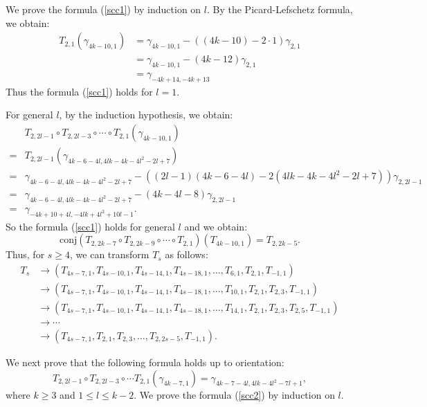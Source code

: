 \documentclass{amsart}
\theoremstyle{plain}
\theoremstyle{definition}
\begin{document}
\par

We prove the formula (\ref{scc1}) by induction on $l$. 
By the Picard-Lefschetz formula, we obtain: 
{\allowdisplaybreaks
\begin{align*}
T_{2,1}(\gamma_{4k-10,1}) &= \gamma_{4k-10,1}-((4k-10)-2\cdot 1)\gamma_{2,1} \\
&= \gamma_{4k-10,1}-(4k-12)\gamma_{2,1} \\
&= \gamma_{-4k+14,-4k+13} 
\end{align*}
}
Thus the formula (\ref{scc1}) holds for $l=1$. 

\par

For general $l$, by the induction hypothesis, we obtain: 
{\allowdisplaybreaks
\begin{align*}
& T_{2,2l-1}\circ T_{2,2l-3}\circ\cdots\circ T_{2,1}(\gamma_{4k-10,1}) \\
= & T_{2,2l-1}(\gamma_{4k-6-4l,4lk-4k-4l^2-2l+7}) \\
= & \gamma_{4k-6-4l,4lk-4k-4l^2-2l+7}-((2l-1)(4k-6-4l)-2(4lk-4k-4l^2-2l+7))\gamma_{2,2l-1} \\
= & \gamma_{4k-6-4l,4lk-4k-4l^2-2l+7}-(4k-4l-8)\gamma_{2,2l-1} \\
= & \gamma_{-4k+10+4l,-4lk+4l^2+10l-1}. 
\end{align*}
}
So the formula (\ref{scc1}) holds for general $l$ and we obtain: 
\[
\text{conj}(T_{2,2k-7}\circ T_{2,2k-9}\circ\cdots\circ T_{2,1})(T_{4k-10,1})=T_{2,2k-5}. 
\]
Thus, for $s\geq 4$, we can transform $T_s$ as follows: 
{\allowdisplaybreaks
\begin{align*}
T_s & \rightarrow (T_{4s-7,1},T_{4s-10,1},T_{4s-14,1},T_{4s-18,1},\ldots,T_{6,1},T_{2,1},T_{-1,1}) \\
& \rightarrow (T_{4s-7,1},T_{4s-10,1},T_{4s-14,1},T_{4s-18,1},\ldots,T_{10,1},T_{2,1},T_{2,3},T_{-1,1}) \\
& \rightarrow (T_{4s-7,1},T_{4s-10,1},T_{4s-14,1},T_{4s-18,1},\ldots,T_{14,1},T_{2,1},T_{2,3},T_{2,5},T_{-1,1}) \\
& \rightarrow \cdots \\
& \rightarrow (T_{4s-7,1},T_{2,1},T_{2,3},\ldots,T_{2,2s-5},T_{-1,1}). 
\end{align*}
}

We next prove that the following formula holds up to orientation: 
\begin{equation}\label{scc2}
T_{2,2l-1}\circ T_{2,2l-3}\circ\cdots T_{2,1}(\gamma_{4k-7,1})=\gamma_{4k-7-4l,4lk-4l^2-7l+1}, 
\end{equation}
where $k\geq 3$ and $1\leq l \leq k-2$. 
We prove the formula (\ref{scc2}) by induction on $l$. 
\end{document}
